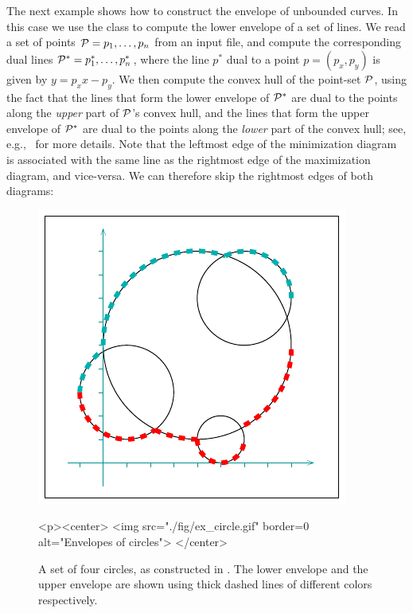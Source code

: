 The next example shows how to construct the envelope of unbounded
curves. In this case we use the  class to
compute the lower envelope of a set of lines. We read a set of
points ${\cal P} = p_1, \ldots, p_n$ from an input file, and compute the
corresponding dual lines ${\cal P}^{*} = p^{*}_1, \ldots, p^{*}_n$, where
the line $p^{*}$ dual to a point $p = (p_x, p_y)$ is given by
$y = p_x x - p_y$. We then compute the convex hull of the point-set
${\cal P}$, using the fact that the lines that form the
lower envelope of ${\cal P}^{*}$ are dual to the points along the
{\em upper} part of ${\cal P}$'s convex hull, and the lines that form the
upper envelope of ${\cal P}^{*}$ are dual to the points along the
{\em lower} part of the convex hull; see,
e.g.,~\cite[Section~11.4]{bkos-cgaa-00} for more details.
Note that the leftmost edge of the minimization diagram is associated
with the same line as the rightmost edge of the maximization diagram,
and vice-versa. We can therefore skip the rightmost edges of both
diagrams:


\begin{figure}[t]
\begin{ccTexOnly}
  \begin{center}
    \includegraphics{Envelope_2/fig/ex_circle}
  \end{center}
\end{ccTexOnly}
\begin{ccHtmlOnly}
  <p><center>
  <img src="./fig/ex_circle.gif" border=0 alt="Envelopes of circles">
  </center>
\end{ccHtmlOnly}
\caption{A set of four circles, as constructed in
. The lower envelope and the upper
envelope are shown using thick dashed lines of different colors
respectively.\label{env2_fig:ex_circ}}
\end{figure}

